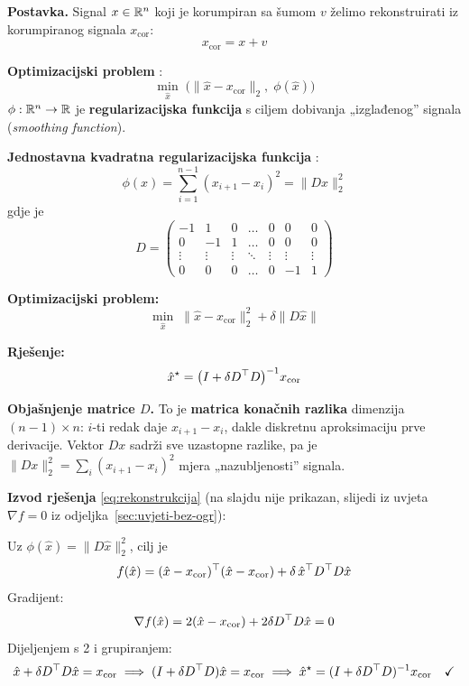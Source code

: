 \begin{zadatak}

\textbf{Postavka.} Signal $x \in \mathbb{R}^n$ koji je korumpiran sa šumom $v$ želimo
rekonstruirati iz korumpiranog signala $x_{\text{cor}}$:
\[
x_{\text{cor}} = x + v
\]

\textbf{Optimizacijski problem} :
\[
\min_{\hat x} \; \big(\|\hat x - x_{\text{cor}}\|_2,\; \phi(\hat x)\big)
\]
$\phi : \mathbb{R}^n \to \mathbb{R}$ je \textbf{regularizacijska funkcija} s ciljem dobivanja
„izglađenog” signala (\emph{smoothing function}).

\medskip
\textbf{Jednostavna kvadratna regularizacijska funkcija} :
\[
\phi(x) = \sum_{i=1}^{n-1}(x_{i+1} - x_i)^2 = \|Dx\|_2^2
\]
gdje je
\[
D = \begin{pmatrix}
-1 & 1 & 0 & \dots & 0 & 0 & 0 \\
0 & -1 & 1 & \dots & 0 & 0 & 0 \\
\vdots & \vdots & \vdots & \ddots & \vdots & \vdots & \vdots \\
0 & 0 & 0 & \dots & 0 & -1 & 1
\end{pmatrix}
\]

\textbf{Optimizacijski problem:}
\[
\min_{\hat x} \; \|\hat x - x_{\text{cor}}\|_2^2 + \delta\|D\hat x\|
\]

\textbf{Rješenje:}
\begin{equation}
\label{eq:rekonstrukcija}
\hat x^\star = \big(I + \delta D^{\top} D\big)^{-1}x_{\text{cor}}
\end{equation}

\medskip
\textbf{Objašnjenje matrice $D$.} To je \textbf{matrica konačnih razlika}
dimenzija $(n-1)\times n$: $i$-ti redak daje $x_{i+1} - x_i$, dakle diskretnu
aproksimaciju prve derivacije. Vektor $Dx$ sadrži sve uzastopne razlike, pa je
$\|Dx\|_2^2 = \sum_i (x_{i+1}-x_i)^2$ mjera „nazubljenosti” signala. \checkmark

\textbf{Izvod rješenja} \eqref{eq:rekonstrukcija} (na slajdu nije prikazan,
slijedi iz uvjeta $\nabla f = 0$ iz odjeljka~\ref{sec:uvjeti-bez-ogr}):

Uz $\phi(\hat x) = \|D\hat x\|_2^2$, cilj je
\[
f(\hat x) = (\hat x - x_{\text{cor}})^{\top}(\hat x - x_{\text{cor}})
          + \delta\,\hat x^{\top} D^{\top} D\hat x
\]
Gradijent:
\[
\nabla f(\hat x) = 2(\hat x - x_{\text{cor}}) + 2\delta D^{\top} D\hat x = 0
\]
Dijeljenjem s 2 i grupiranjem:
\[
\hat x + \delta D^{\top} D\hat x = x_{\text{cor}}
\;\Longrightarrow\;
(I + \delta D^{\top} D)\hat x = x_{\text{cor}}
\;\Longrightarrow\;
\hat x^\star = (I + \delta D^{\top} D)^{-1}x_{\text{cor}}
\quad\checkmark
\]


\end{zadatak}
